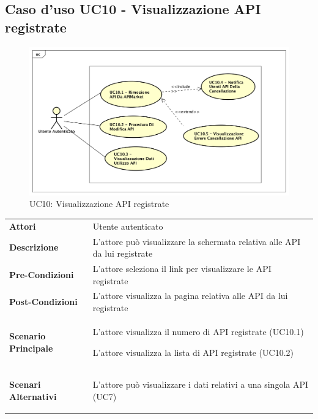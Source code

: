 \newpage
\subsection{Caso d'uso UC10 - Visualizzazione API registrate}
\label{UC10}
\begin{figure}[ht]
	\centering
	\includegraphics[scale=0.45]{UML/UC10.png}
	\caption{UC10: Visualizzazione API registrate}
\end{figure}

\begin{longtable}{ l | p{11cm}}
	\hline
	\rowcolor{Gray}
	\multicolumn{2}{c}{UC10 - Visualizzazione API registrate}\\
	\hline
	
	 \textbf{Attori} & Utente autenticato  \\
	\textbf{Descrizione} & L'attore può visualizzare la schermata relativa alle API da lui registrate \\
	\textbf{Pre-Condizioni} & L'attore seleziona il link per visualizzare le API registrate  \\
	\textbf{Post-Condizioni} & L'attore visualizza la pagina relativa alle API da lui registrate\\
	\textbf{Scenario Principale} & 
	\begin{enumerate*}[label=(\arabic*.),itemjoin={\newline}]
		\item L'attore visualizza il numero di API registrate (UC10.1)
		\item L'attore visualizza la lista di API registrate (UC10.2)
	\end{enumerate*}\\
	\textbf{Scenari Alternativi} & 
	\begin{enumerate*}[label=(\arabic*.),itemjoin={\newline}]
		\item L'attore può visualizzare i dati relativi a una singola API (UC7)
	\end{enumerate*}\\
\end{longtable}


